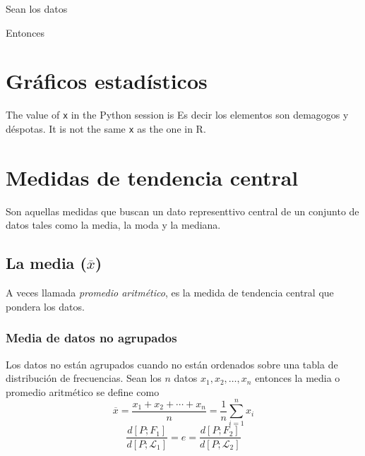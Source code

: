 \documentclass[10pt,]{krantz}
\theoremstyle{definition}
\theoremstyle{definition}
\theoremstyle{definition}
\theoremstyle{remark}
\let\BeginKnitrBlock\begin \let\EndKnitrBlock\end
\begin{document}
\BeginKnitrBlock{exercise}
\protect\hypertarget{exr:unnamed-chunk-3}{}{\label{exr:unnamed-chunk-3} }Sean los datos
\EndKnitrBlock{exercise}

\BeginKnitrBlock{solution}
\iffalse{} {Solución. } \fi{}Entonces
\EndKnitrBlock{solution}

\hypertarget{gruxe1ficos-estaduxedsticos}{%
\chapter{Gráficos estadísticos}\label{gruxe1ficos-estaduxedsticos}}

The value of \texttt{x} in the Python session is Es decir los elementos son demagogos y déspotas.
It is not the same \texttt{x} as the one in R.

\hypertarget{medidas-de-tendencia-central}{%
\chapter{Medidas de tendencia central}\label{medidas-de-tendencia-central}}

Son aquellas medidas que buscan un dato representtivo central de un conjunto de datos tales como la media, la moda y la mediana.

\hypertarget{la-media-overlinex}{%
\section{\texorpdfstring{La media (\(\overline{x}\))}{La media (\textbackslash{}overline\{x\})}}\label{la-media-overlinex}}

A veces llamada \emph{promedio aritmético}, es la medida de tendencia central que pondera los datos.

\hypertarget{media-de-datos-no-agrupados}{%
\subsection{Media de datos no agrupados}\label{media-de-datos-no-agrupados}}

Los datos no están agrupados cuando no están ordenados sobre una tabla de distribución de frecuencias. Sean los \(n\) datos \(x_1, x_2,\ldots, x_n\) entonces la media o promedio aritmético se define como
\begin{equation}
\overline{x}=\frac{x_1+x_2+\cdots+x_n}{n}=\frac{1}{n}\sum_{i=1}^nx_i
\label{eq:w1}
\end{equation}
\begin{equation}
\frac{d\left[P;F_1\right]}{d\left[P;\mathcal{L}_1\right]}=e=\frac{d\left[P;F_2\right]}{d\left[P;\mathcal{L}_2\right]}
\label{eq:ww}
\end{equation}
\end{document}
